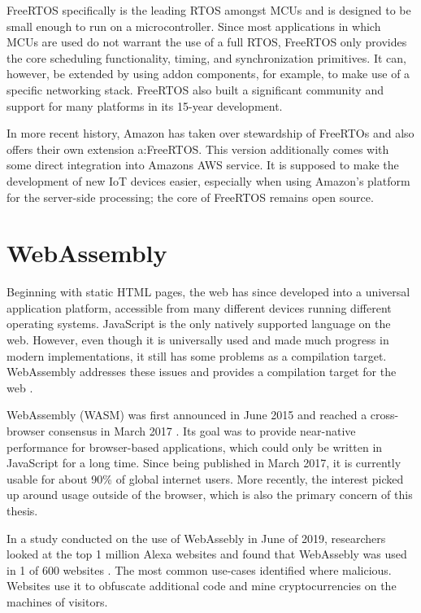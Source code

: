 FreeRTOS specifically is the leading RTOS amongst MCUs and is designed to be small enough to run on a microcontroller\autocite{noauthor_freertos_nodate}. Since most applications in which MCUs are used do not warrant the use of a full RTOS, FreeRTOS only provides the core scheduling functionality, timing, and synchronization primitives. It can, however, be extended by using addon components, for example, to make use of a specific networking stack. FreeRTOS also built a significant community and support for many platforms in its 15-year development.

In more recent history, Amazon has taken over stewardship of FreeRTOs and also offers their own extension a:FreeRTOS\autocite{lardinois_amazon_nodate}. This version additionally comes with some direct integration into Amazons AWS service\autocite{noauthor_freertos_nodate-1}. It is supposed to make the development of new IoT devices easier, especially when using Amazon's platform for the server-side processing; the core of FreeRTOS remains open source.

\section{WebAssembly}\label{sec:b_wasm}

Beginning with static HTML pages, the web has since developed into a universal application platform, accessible from many different devices running different operating systems. JavaScript is the only natively supported language on the web. However, even though it is universally used and made much progress in modern implementations, it still has some problems as a compilation target. WebAssembly addresses these issues and provides a compilation target for the web \autocite{mdn_contributors_webassembly_nodate}.

WebAssembly (WASM) was first announced in June 2015 \autocite{wagner_webassembly_2015} and reached a cross-browser consensus in March 2017 \autocite{wagner_webassembly_2017-1}. Its goal was to provide near-native performance for browser-based applications, which could only be written in JavaScript for a long time. Since being published in March 2017, it is currently usable for about 90\% of global internet users. More recently, the interest picked up around usage outside of the browser, which is also the primary concern of this thesis.

In a study conducted on the use of WebAssebly in June of 2019, researchers looked at the top 1 million Alexa websites and found that WebAssebly was used in 1 of 600 websites \autocite{musch_new_2019}. The most common use-cases identified where malicious. Websites use it to obfuscate additional code and mine cryptocurrencies on the machines of visitors.

